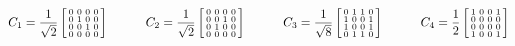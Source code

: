  {\tiny \[
  C_1 = \frac{1}{\sqrt{2}} \left[\begin{smallmatrix} 0&0&0&0\\ 0&1&0&0\\ 0&0&1&0\\ 0&0&0&0\end{smallmatrix}\right]
  \hspace{3em}
  C_2 = \frac{1}{\sqrt{2}} \left[\begin{smallmatrix} 0&0&0&0\\ 0&0&1&0\\ 0&1&0&0\\ 0&0&0&0\end{smallmatrix}\right]
  \hspace{3em}
  C_3 = \frac{1}{\sqrt{8}} \left[\begin{smallmatrix} 0&1&1&0\\ 1&0&0&1\\ 1&0&0&1\\ 0&1&1&0\end{smallmatrix}\right]
  \hspace{3em}
  C_4 = \frac{1}{2}        \left[\begin{smallmatrix} 1&0&0&1\\ 0&0&0&0\\ 0&0&0&0\\ 1&0&0&1\end{smallmatrix}\right]
 \]}
\EndDeferredSolution

